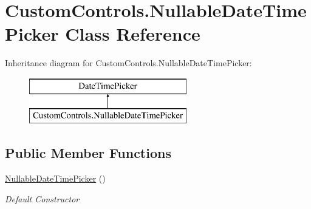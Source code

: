 \hypertarget{class_custom_controls_1_1_nullable_date_time_picker}{}\section{Custom\+Controls.\+Nullable\+Date\+Time\+Picker Class Reference}
\label{class_custom_controls_1_1_nullable_date_time_picker}
Inheritance diagram for Custom\+Controls.\+Nullable\+Date\+Time\+Picker\+:\begin{figure}[H]
\begin{center}
\leavevmode
\includegraphics[height=2.000000cm]{class_custom_controls_1_1_nullable_date_time_picker}
\end{center}
\end{figure}
\subsection*{Public Member Functions}
\begin{DoxyCompactItemize}
\item 
\hyperlink{class_custom_controls_1_1_nullable_date_time_picker_ae34b0db983f9509c0442e730a8baa417}{Nullable\+Date\+Time\+Picker} ()
\begin{DoxyCompactList}\small\item\em Default Constructor \end{DoxyCompactList}\end{DoxyCompactItemize}
